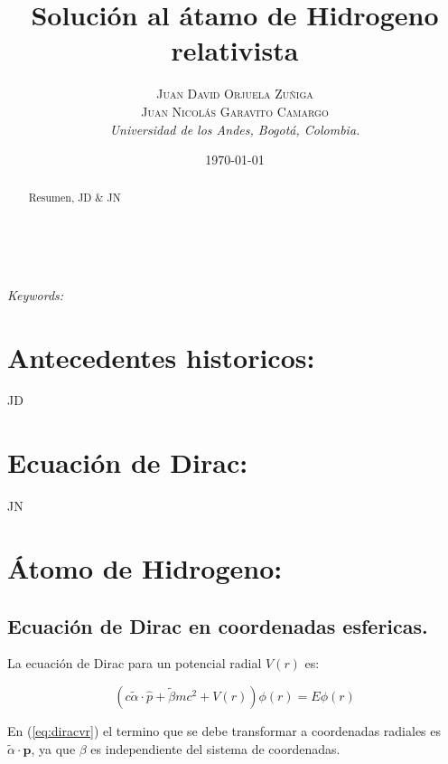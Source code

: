 \documentclass[a4paper, 12pt]{article} %
\title{\textbf{Soluci\'on al \'atamo de Hidrogeno relativista}\\ %
} %
\author{\textsc{Juan David Orjuela Zu\~niga \\ Juan Nicol\'as Garavito Camargo} %
\\{\textit{Universidad de los Andes, Bogot\'a, Colombia.}}} %
\date{\today} %
\makeatletter
\renewcommand{\maketitle}{ %
\begin{flushright} %
{\LARGE\@title} %

\vspace{50pt} %

{\large\@author} %
\\\@date %

\vspace{40pt} %
\end{flushright}
}
\makeatother
\begin{document}
\maketitle %



\begin{abstract}
Resumen, JD \& JN
\end{abstract}
\hspace*{3,6mm}\textit{Keywords:}  %

\vspace{30pt} %


\section{Antecedentes historicos:}
JD
\section{Ecuaci\'on de Dirac:}
JN
\section{\'Atomo de Hidrogeno:}

\subsection{Ecuaci\'on de Dirac en coordenadas esfericas.}

La ecuaci\'on de Dirac para un potencial radial $V(r)$ es:

\begin{equation}\label{eq:diracvr}
(c \widetilde{\alpha} \cdot \hat{p} + \widetilde{\beta} m c^2 + V(r) ) \phi(r) = E \phi (r)
\end{equation}

En (\ref{eq:diracvr}) el termino que se debe transformar a coordenadas radiales
 es $\widetilde{\alpha} \cdot \hat{\mathbf{p}}$, ya que \textbf{$\beta$} es independiente del 
sistema de coordenadas. 
\end{document}

